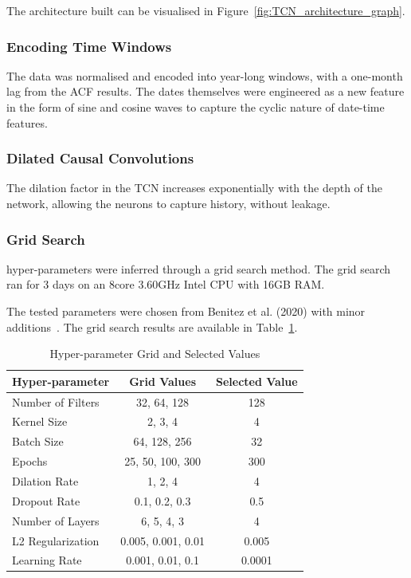 \documentclass{ieeeaccess}
\begin{document}
The architecture built can be visualised in Figure~\ref{fig:TCN_architecture_graph}.


\subsubsection{Encoding Time Windows}

The data was normalised and encoded into year-long windows, with a one-month lag from the ACF results.  The dates themselves were engineered as a new feature in the form of sine and cosine waves to capture the cyclic nature of date-time features.

\subsubsection{Dilated Causal Convolutions}
The dilation factor in the TCN increases exponentially with the depth of the network, allowing the neurons to capture history, without leakage.

\subsubsection{Grid Search}

hyper-parameters were inferred through a grid search method. The grid search ran for 3 days on an 8core 3.60GHz Intel CPU with 16GB RAM.

The tested parameters were chosen from Benitez et al. (2020) with minor additions~\cite{Benitez2020}. The grid search results are available in Table~\ref{tab:hyperparameters}.

\begin{table}[h]
\centering
\caption{Hyper-parameter Grid and Selected Values}
\begin{tabular}{lcc}
\hline
Hyper-parameter & Grid Values & Selected Value \\
\hline
Number of Filters & 32, 64, 128 & 128 \\
Kernel Size & 2, 3, 4 & 4 \\
Batch Size & 64, 128, 256 & 32 \\
Epochs & 25, 50, 100, 300 & 300 \\
Dilation Rate & 1, 2, 4 & 4 \\
Dropout Rate & 0.1, 0.2, 0.3 & 0.5 \\
Number of Layers & 6, 5, 4, 3 & 4 \\
L2 Regularization & 0.005, 0.001, 0.01 & 0.005 \\
Learning Rate & 0.001, 0.01, 0.1 & 0.0001 \\
\hline
\end{tabular}
\label{tab:hyperparameters}
\end{table}
\end{document}
